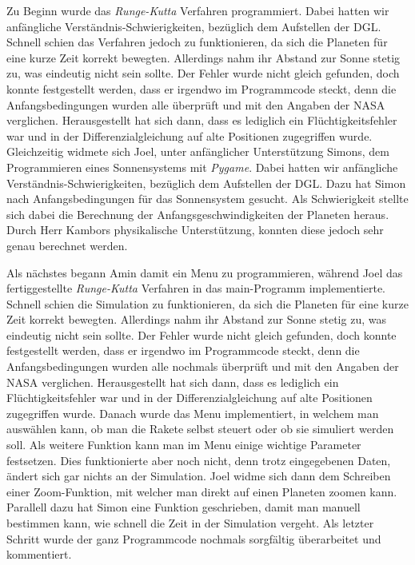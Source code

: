 \documentclass{article}
\begin{document}
Zu Beginn wurde das \textit{Runge-Kutta} Verfahren programmiert. Dabei hatten wir anfängliche Verständnis-Schwierigkeiten, bezüglich dem Aufstellen der DGL. Schnell schien das Verfahren jedoch zu funktionieren, da sich die Planeten für eine kurze Zeit korrekt bewegten. Allerdings nahm ihr Abstand zur Sonne stetig zu, was eindeutig nicht sein sollte. Der Fehler wurde nicht gleich gefunden, doch konnte festgestellt werden, dass er irgendwo im Programmcode steckt, denn die Anfangsbedingungen wurden alle überprüft und mit den Angaben der NASA verglichen. Herausgestellt hat sich dann, dass es lediglich ein Flüchtigkeitsfehler war und in der Differenzialgleichung auf alte Positionen zugegriffen wurde.
Gleichzeitig widmete sich Joel, unter anfänglicher Unterstützung Simons, dem Programmieren eines Sonnensystems mit \textit{Pygame}. Dabei hatten wir anfängliche Verständnis-Schwierigkeiten, bezüglich dem Aufstellen der DGL. Dazu hat Simon nach Anfangsbedingungen für das Sonnensystem gesucht. Als Schwierigkeit stellte sich dabei die Berechnung der Anfangsgeschwindigkeiten der Planeten heraus. Durch Herr Kambors physikalische Unterstützung, konnten diese jedoch sehr genau berechnet werden. 

Als nächstes begann Amin damit ein Menu zu programmieren, während Joel das fertiggestellte \textit{Runge-Kutta} Verfahren in das main-Programm implementierte. Schnell schien die Simulation zu funktionieren, da sich die Planeten für eine kurze Zeit korrekt bewegten. Allerdings nahm ihr Abstand zur Sonne stetig zu, was eindeutig nicht sein sollte. Der Fehler wurde nicht gleich gefunden, doch konnte festgestellt werden, dass er irgendwo im Programmcode steckt, denn die Anfangsbedingungen wurden alle nochmals überprüft und mit den Angaben der NASA verglichen. Herausgestellt hat sich dann, dass es lediglich ein Flüchtigkeitsfehler war und in der Differenzialgleichung auf alte Positionen zugegriffen wurde. Danach wurde das Menu implementiert, in welchem man auswählen kann, ob man die Rakete selbst steuert oder ob sie simuliert werden soll. Als weitere Funktion kann man im Menu einige wichtige Parameter festsetzen. Dies funktionierte aber noch nicht, denn trotz eingegebenen Daten, ändert sich gar nichts an der Simulation. Joel widme sich dann dem Schreiben einer Zoom-Funktion, mit welcher man direkt auf einen Planeten zoomen kann. Parallell dazu hat Simon eine Funktion geschrieben, damit man manuell bestimmen kann, wie schnell die Zeit in der Simulation vergeht. 
Als letzter Schritt wurde der ganz Programmcode nochmals sorgfältig überarbeitet und kommentiert.
\end{document}
